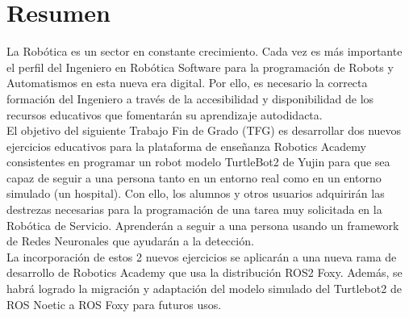 \chapter*{Resumen}

La Robótica es un sector en constante crecimiento. Cada vez es más importante el perfil del Ingeniero en Robótica Software para la programación de Robots y Automatismos en esta nueva era digital. Por ello, es necesario la correcta formación del Ingeniero a través de la accesibilidad y disponibilidad de los recursos educativos que fomentarán su aprendizaje autodidacta.\\

El objetivo del siguiente Trabajo Fin de Grado (TFG) es desarrollar dos nuevos ejercicios educativos para la plataforma de enseñanza Robotics Academy consistentes en programar un robot modelo TurtleBot2 de Yujin para que sea capaz de seguir a una persona tanto en un entorno real como en un entorno simulado (un hospital). Con ello, los alumnos y otros usuarios adquirirán las destrezas necesarias para la programación de una tarea muy solicitada en la Robótica de Servicio. Aprenderán a seguir a una persona usando un framework de Redes Neuronales que ayudarán a la detección.\\

La incorporación de estos 2 nuevos ejercicios se aplicarán a una nueva rama de desarrollo de Robotics Academy que usa la distribución ROS2 Foxy. Además, se habrá logrado la migración y adaptación del modelo simulado del Turtlebot2 de ROS Noetic a ROS Foxy para futuros usos.